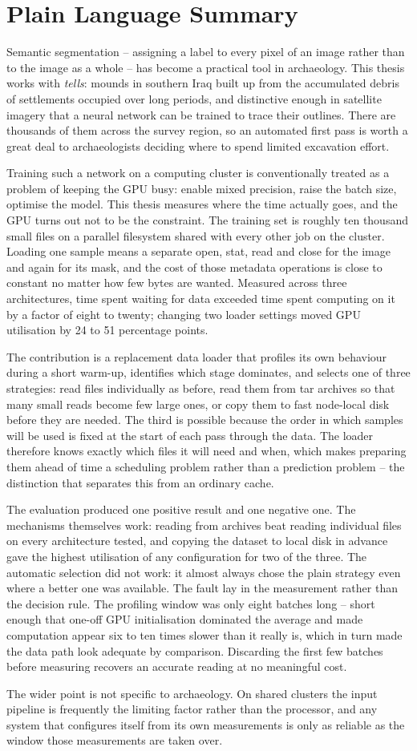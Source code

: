 \section*{Plain Language Summary}

Semantic segmentation -- assigning a label to every pixel of an image rather
than to the image as a whole -- has become a practical tool in archaeology.
This thesis works with \emph{tells}: mounds in southern Iraq built up from the
accumulated debris of settlements occupied over long periods, and distinctive
enough in satellite imagery that a neural network can be trained to trace their
outlines. There are thousands of them across the survey region, so an automated
first pass is worth a great deal to archaeologists deciding where to spend
limited excavation effort.

Training such a network on a computing cluster is conventionally treated as a
problem of keeping the GPU busy: enable mixed precision, raise the batch size,
optimise the model. This thesis measures where the time actually goes, and the
GPU turns out not to be the constraint. The training set is roughly ten thousand
small files on a parallel filesystem shared with every other job on the cluster.
Loading one sample means a separate open, stat, read and close for the image and
again for its mask, and the cost of those metadata operations is close to
constant no matter how few bytes are wanted. Measured across three architectures,
time spent waiting for data exceeded time spent computing on it by a factor of
eight to twenty; changing two loader settings moved GPU utilisation by 24 to 51
percentage points.

The contribution is a replacement data loader that profiles its own behaviour
during a short warm-up, identifies which stage dominates, and selects one of
three strategies: read files individually as before, read them from tar archives
so that many small reads become few large ones, or copy them to fast node-local
disk before they are needed. The third is possible because the order in which
samples will be used is fixed at the start of each pass through the data. The
loader therefore knows exactly which files it will need and when, which makes
preparing them ahead of time a scheduling problem rather than a prediction
problem -- the distinction that separates this from an ordinary cache.

The evaluation produced one positive result and one negative one. The mechanisms
themselves work: reading from archives beat reading individual files on every
architecture tested, and copying the dataset to local disk in advance gave the
highest utilisation of any configuration for two of the three. The automatic
selection did not work: it almost always chose the plain strategy even where a
better one was available. The fault lay in the measurement rather than the
decision rule. The profiling window was only eight batches long -- short enough
that one-off GPU initialisation dominated the average and made computation appear
six to ten times slower than it really is, which in turn made the data path look
adequate by comparison. Discarding the first few batches before measuring
recovers an accurate reading at no meaningful cost.

The wider point is not specific to archaeology. On shared clusters the input
pipeline is frequently the limiting factor rather than the processor, and any
system that configures itself from its own measurements is only as reliable as
the window those measurements are taken over.
